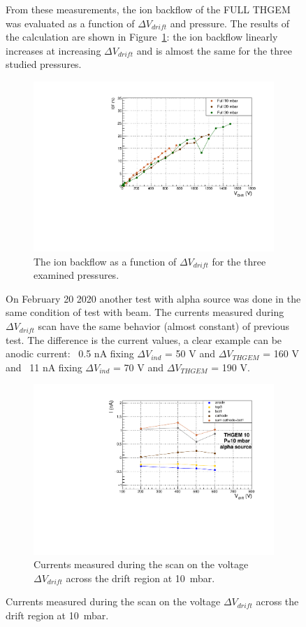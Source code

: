 \documentclass[a4paper, 11 pt]{article}
\newcommand{\Vind}{$\Delta V_{ind}$}
\newcommand{\Vthgem}{$\Delta V_{THGEM}$}
\newcommand{\Vdrift}{$ \Delta V_{drift}$}
\begin{document}
\begin{figure}[htbp]
From these measurements, the ion backflow of the FULL THGEM was evaluated as a function of \Vdrift{} and pressure.
The results of the calculation are shown in Figure~\ref{fig:ion_backflow_FULL}: the ion backflow linearly increases at increasing \Vdrift{} and is almost the same for the three studied pressures.

\begin{figure}[htbp]
	\centering
	\includegraphics[width=\textwidth]{Immagini/IBFvsDrift_FULLonly.pdf}
	\caption{The ion backflow as a function of \Vdrift{} for the three examined pressures.}
	\label{fig:ion_backflow_FULL}
\end{figure}

On February 20 2020 another test with alpha source was done in the same condition of test with beam. The currents measured during \Vdrift{} scan have the same behavior (almost constant) of previous test. The difference is the current values, a clear example can be anodic current: ~0.5 nA fixing \Vind{} = 50 V and \Vthgem{} = 160 V and ~11 nA fixing \Vind{} = 70 V and \Vthgem{} = 190 V.

\begin{figure}[htbp]
	\centering
	\includegraphics[width=\textwidth]{Immagini/driftScan_THGEM10_alpha_10mbar.pdf}
	\caption{Currents measured during the scan on the voltage \Vdrift{} across the drift region at 10~mbar.}
	\label{fig:driftScan_THGEM10_alpha_10mbar}



\end{figure}
\end{figure}
\end{document}
